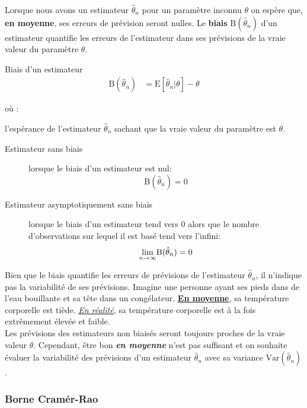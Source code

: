 \documentclass[10pt, french]{article}
\begin{document}
\begin{multicols*}{2}
Lorsque nous avons un estimateur $\hat{\theta}_{n}$ pour un paramètre inconnu $\theta$ on espère que, \textbf{en moyenne}, ses erreurs de prévision seront nulles. Le \textbf{biais} $\text{B}(\hat{\theta}_{n})$ d'un estimateur quantifie les erreurs de l'estimateur dans ses prévisions de la vraie valeur du paramètre $\theta$.

\begin{algo}{Biais d'un estimateur}
\begin{align*}
	\text{B}(\hat{\theta}_{n}) 
	&= 	\text{E}[\hat{\theta}_{n} | \theta] - \theta
\end{align*}

où :
\begin{description}[font = \normalfont]
	\item[$\text{E}\lbrack\hat{\theta}_{n} | \theta\rbrack$]	l'espérance de l'estimateur $\hat{\theta}_{n}$ sachant que la vraie valeur du paramètre est $\theta$.
\end{description}

\tcbline

\begin{description}
	\item[Estimateur sans biais]	lorsque le biais d'un estimateur est nul:
		 \[
		 	\text{B}(\hat{\theta}_{n}) = 0
		 \]
	\item[Estimateur asymptotiquement sans biais]	lorsque le biais d'un estimateur tend vers 0 alors que le nombre d'observations sur lequel il est basé tend vers l'infini: 
		\[
			\underset{n \rightarrow \infty}{\lim}\text{B}(\hat{\theta}_{n}) = 0
		\]
\end{description}
\end{algo}

Bien que le biais quantifie les erreurs de prévisions de l'estimateur $\hat{\theta}_{n}$, il n'indique pas la variabilité de ses prévisions. Imagine une personne ayant ses pieds dans de l'eau bouillante et sa tête dans un congélateur. \textbf{\underline{En moyenne}}, sa température corporelle est tiède. \textit{\underline{En réalité}}, sa température corporelle est à la fois extrêmement élevée et faible. \\

Les prévisions des estimateurs non biaisés seront toujours proches de la vraie valeur $\theta$. Cependant, être bon \textit{\textbf{en moyenne}} n'est pas suffisant et on souhaite évaluer la variabilité des prévisions d'un estimateur $\hat{\theta}_{n}$ avec sa variance $\text{Var}(\hat{\theta}_{n})$.

\subsubsection{Borne Cramér-Rao}
\label{sec:cramer_rao}


\end{multicols*}
\end{document}
